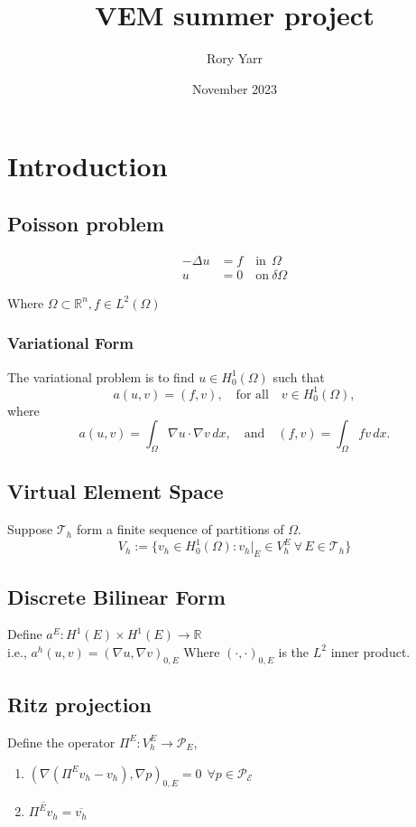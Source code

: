 \documentclass{article}
\title{VEM summer project}
\author{Rory Yarr}
\date{November 2023}
\begin{document}
\maketitle

\tableofcontents

\section{Introduction}

\subsection{Poisson problem}
\begin{align*}
    -\Delta{u} & = f \quad  \text{in}\ \ \Omega \\
    u & = 0 \quad  \text{on}\ \delta\Omega
\end{align*}

Where $\Omega \subset \mathbb{R}^n, f \in L^2(\Omega)$ %

\subsubsection{Variational Form}
The variational problem is to find $ u \in H^1_0(\Omega)$ such that 
\[ a(u,v) = (f,v), \quad \text{for all} \quad v \in H^1_0(\Omega),\]
where 
\[ a(u,v) = \int_{\Omega} \nabla u \cdot \nabla v \,dx, \quad \text{and}\quad 
(f,v) =\int_{\Omega} f v \,dx. \]


\subsection{Virtual Element Space}
Suppose $\mathcal{T}_h$ form a finite sequence of partitions of $\Omega$.
$$V_h:= \{v_h \in H^1_0(\Omega):v_h|_E \in V_h^E\  \forall \, E \in \mathcal{T}_h\}$$  

\subsection{Discrete Bilinear Form}
Define $a^E:H^1(E)\times H^1(E)\rightarrow \mathbb{R}$\\
i.e., $a^h(u,v)=(\nabla u,\nabla v)_{0,E}$
Where $(\cdot,\cdot)_{0,E}$ is the $L^2$ inner product.

\subsection{Ritz projection}
Define the operator $\Pi^E: V_h^E \rightarrow \mathcal{P}_E$,
\begin{enumerate}
    \item $(\nabla(\Pi^Ev_h-v_h),\nabla p)_{0,E} = 0 \hspace{5pt} \forall p \in \mathcal{P_E}$
    \item $\overline{\Pi^Ev_h} = \overline{v_h}$
\end{enumerate}
\end{document}

